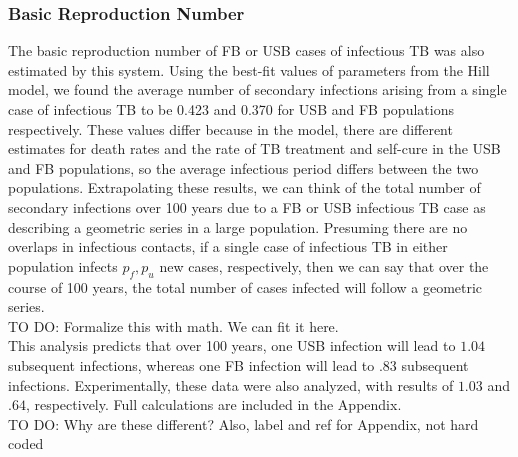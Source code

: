 \documentclass{amsart}
\newcommand{\TODO}[1]{\hfill\\{\huge \color{red} TO DO:} #1 \hfill \\}
\begin{document}
\subsubsection{Basic Reproduction Number}
The basic reproduction number of FB or USB cases of infectious TB was also
estimated by this system. Using the best-fit values of parameters from the 
Hill model, we found the average number of secondary infections arising from
a single case of infectious TB to be 0.423 and 0.370 for USB and FB populations
respectively.  These values differ because in the model, there are different
estimates for death rates and the rate of TB treatment and self-cure in the USB and FB populations, 
so the average infectious period differs between the two populations.
Extrapolating these results, we can think of the
total number of secondary infections over 100 years due to a FB or USB
infectious TB case as describing a geometric series in a large population.
Presuming there are no overlaps in infectious contacts, if a single case of
infectious TB in either population infects $p_f, p_u$ new cases,
respectively, then we can say that over the course of 100 years, the total
number of cases infected will follow a geometric series.
\TODO{Formalize this with math. We can fit it here.}
This analysis predicts that over 100 years, one USB infection will lead to
$1.04$ subsequent infections, whereas one FB infection will lead to $.83$
subsequent infections. Experimentally, these data were also analyzed, with
results of $1.03$ and $.64$, respectively.  Full calculations are included in
the Appendix.  
\TODO{Why are these different? Also, label and ref for Appendix, not hard coded}
\end{document}
